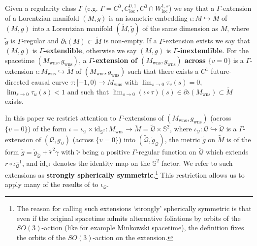 \documentclass{article}
\newcommand{\Q}{\mathcal{Q}}
\newcommand{\loc}{\mathrm{loc}}
\newcommand{\Sp}{\mathbb{S}}
\newcommand{\Mw}{M_{\mathrm{wns}}}
\newcommand{\gw}{g_{\mathrm{wns}}}
\newcommand{\rd}{\partial}
\begin{document}
Given a regularity class $\Gamma$ (e.g. $\Gamma=C^0,C^{0,1}_{\loc},C^0\cap W^{1,s}_{\loc}$) we say that a $\Gamma$-extension of a Lorentzian manifold $(M,g)$ is an isometric embedding $\iota:M\hookrightarrow\tilde{M}$ of $(M,g)$ into a Lorentzian manifold $(\tilde{M},\tilde{g})$ of the same dimension as $M$, where $\tilde{g}$ is $\Gamma$-regular and $\partial\iota(M)\subset\tilde{M}$ is non-empty.
If a $\Gamma$-extension exists we say that $(M,g)$ is \textbf{$\Gamma$-extendible}, otherwise we say $(M,g)$ is \textbf{$\Gamma$-inextendible}. 
For the spacetime $(\Mw,\gw)$, a \textbf{$\Gamma$-extension of $(\Mw,\gw)$ across $\{v=0\}$} is a $\Gamma$-extension $\iota:\Mw\hookrightarrow\tilde{M}$ of $(\Mw,\gw)$ such that there exists a $C^1$ future-directed causal curve $\tau : [-1,0) \to \Mw$ with $\lim_{s \to 0} \tau_{v}(s) = 0$, $\lim_{s \to 0} \tau_u(s) <1$ and such that $\lim_{s \to 0}(\iota \circ \tau)(s) \in \rd \iota(\Mw) \subset \tilde{M}$ exists. 

In this paper we restrict attention to $\Gamma$-extensions of $(\Mw,\gw)$ (across $\{v=0\}$) of the form $\iota=\iota_{\Q}\times\text{id}_{\Sp^2}:\Mw\rightarrow\tilde{M}=\tilde{\Q}\times\Sp^2$, where $\iota_{\Q}:\Q\hookrightarrow\tilde{\Q}$ is a $\Gamma$-extension of $(\Q,g_{\Q})$ (across $\{v=0\}$) into $(\tilde{\Q}, \tilde{g}_{\tilde{\Q}})$, the metric $\tilde{g}$ on $\tilde{M}$ is of the form $\tilde{g} = \tilde{g}_{\tilde{\Q}} + \tilde{r}^2 \gamma$ with $\tilde{r}$ being a positive $\Gamma$-regular function on $\tilde{\Q}$ which extends $r \circ \iota_{\Q}^{-1}$, and  $\text{id}_{\Sp^2}$ denotes the identity map on the $\Sp^2$ factor. We refer to such extensions as \textbf{strongly spherically symmetric}.\footnote{The reason for calling such extensions `strongly' spherically symmetric is that even if  the original spacetime admits alternative foliations by orbits of the $SO(3)$-action (like for example Minkowski spacetime), the definition fixes the orbits of the $SO(3)$-action on the extension.} This restriction allows us to apply many of the results of \cite{CameronSbierski} to $\iota_\Q$. 
\end{document}
